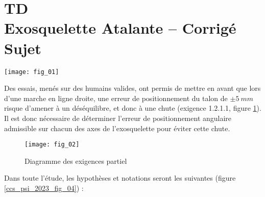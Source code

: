 \chapter*{TD  \\ 
Exosquelette Atalante -- \ifprof Corrigé \else Sujet \fi}

\iflivret {} \else
\ifprof  {} \else \fi
\fi





\ifprof
\else
\begin{marginfigure}
\centering
\texttt{[image: fig\_01]}
\end{marginfigure}


Des essais, menés sur des humains valides, ont permis de mettre en avant que lors d'une marche en ligne droite, une erreur de positionnement du talon de $\pm \SI{5}{mm}$ risque d'amener à un déséquilibre, et donc à une chute (exigence 1.2.1.1, figure \ref{ccs_psi_2023_fig_02}). Il est donc nécessaire de déterminer l'erreur de positionnement angulaire admissible sur chacun des axes de l'exosquelette pour éviter cette chute.

\begin{figure}[!h]
\centering
\texttt{[image: fig\_02]}
\caption{Diagramme des exigences partiel \label{ccs_psi_2023_fig_02}}
\end{figure}


Dans toute l'étude, les hypothèses et notations seront les suivantes (figure \ref{ccs_psi_2023_fig_04}) :

